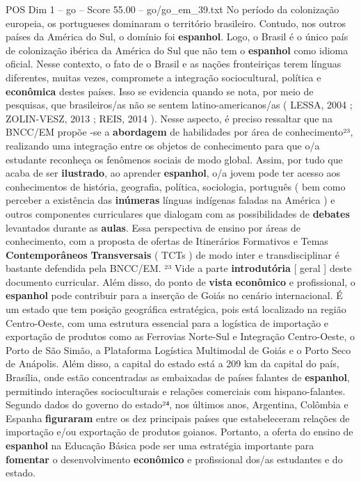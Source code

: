 \begin{textsample}{POS Dim 1 – go – Score 55.00 – go/go\_em\_39.txt}
No período da colonização europeia, os portugueses dominaram o território brasileiro.
Contudo, nos outros países da América do Sul, o domínio foi \textbf{espanhol}.
Logo, o Brasil é o único país de colonização ibérica da América do Sul que não tem o \textbf{espanhol} como idioma oficial.
Nesse contexto, o fato de o Brasil e as nações fronteiriças terem línguas diferentes, muitas vezes, compromete a integração sociocultural, política e \textbf{econômica} destes países.
Isso se evidencia quando se nota, por meio de pesquisas, que brasileiros/as não se sentem latino-americanos/as ( LESSA, 2004 ; ZOLIN-VESZ, 2013 ; REIS, 2014 ).
Nesse aspecto, é preciso ressaltar que na BNCC/EM propõe -se a \textbf{abordagem} de habilidades por área de conhecimento²³, realizando uma integração entre os objetos de conhecimento para que o/a estudante reconheça os fenômenos sociais de modo global.
Assim, por tudo que acaba de ser \textbf{ilustrado}, ao aprender \textbf{espanhol}, o/a jovem pode ter acesso aos conhecimentos de história, geografia, política, sociologia, português ( bem como perceber a existência das \textbf{inúmeras} línguas indígenas faladas na América ) e outros componentes curriculares que dialogam com as possibilidades de \textbf{debates} levantados durante as \textbf{aulas}.
Essa perspectiva de ensino por áreas de conhecimento, com a proposta de ofertas de Itinerários Formativos e Temas \textbf{Contemporâneos} \textbf{Transversais} ( TCTs ) de modo inter e transdisciplinar é bastante defendida pela BNCC/EM. ²³ Vide a parte \textbf{introdutória} [ geral ] deste documento curricular.
Além disso, do ponto de \textbf{vista} \textbf{econômico} e profissional, o \textbf{espanhol} pode contribuir para a inserção de Goiás no cenário internacional.
É um estado que tem posição geográfica estratégica, pois está localizado na região Centro-Oeste, com uma estrutura essencial para a logística de importação e exportação de produtos como as Ferrovias Norte-Sul e Integração Centro-Oeste, o Porto de São Simão, a Plataforma Logística Multimodal de Goiás e o Porto Seco de Anápolis.
Além disso, a capital do estado está a 209 km da capital do país, Brasília, onde estão concentradas as embaixadas de países falantes de \textbf{espanhol}, permitindo interações socioculturais e relações comerciais com hispano-falantes.
Segundo dados do governo do estado²⁴, nos últimos anos, Argentina, Colômbia e Espanha \textbf{figuraram} entre os dez principais países que estabeleceram relações de importação e/ou exportação de produtos goianos.
Portanto, a oferta do ensino de \textbf{espanhol} na Educação Básica pode ser uma estratégia importante para \textbf{fomentar} o desenvolvimento \textbf{econômico} e profissional dos/as estudantes e do estado.

\end{textsample}
